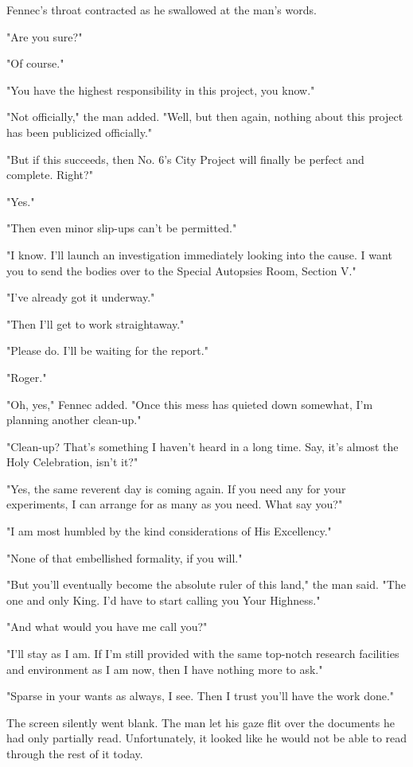 Fennec's throat contracted as he swallowed at the man's words.

"Are you sure?"

"Of course."

"You have the highest responsibility in this project, you know."

"Not officially," the man added. "Well, but then again, nothing about
this project has been publicized officially."

"But if this succeeds, then No. 6's City Project will finally be perfect
and complete. Right?"

"Yes."

"Then even minor slip-ups can't be permitted."

"I know. I'll launch an investigation immediately looking into the
cause. I want you to send the bodies over to the Special Autopsies Room,
Section V."

"I've already got it underway."

"Then I'll get to work straightaway."

"Please do. I'll be waiting for the report."

"Roger."

"Oh, yes," Fennec added. "Once this mess has quieted down somewhat, I'm
planning another clean-up."

"Clean-up? That's something I haven't heard in a long time. Say, it's
almost the Holy Celebration, isn't it?"

"Yes, the same reverent day is coming again. If you need any for your
experiments, I can arrange for as many as you need. What say you?"

"I am most humbled by the kind considerations of His Excellency."

"None of that embellished formality, if you will."

"But you'll eventually become the absolute ruler of this land," the man
said. "The one and only King. I'd have to start calling you Your
Highness."

"And what would you have me call you?"

"I'll stay as I am. If I'm still provided with the same top-notch
research facilities and environment as I am now, then I have nothing
more to ask."

"Sparse in your wants as always, I see. Then I trust you'll have the
work done."

The screen silently went blank. The man let his gaze flit over the
documents he had only partially read. Unfortunately, it looked like he
would not be able to read through the rest of it today.

